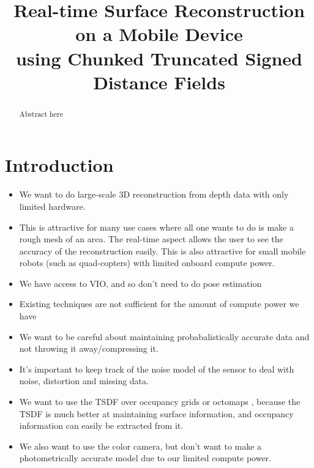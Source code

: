 \documentclass[conference,10pt]{IEEEtran}
\title{\Large Real-time Surface Reconstruction on a Mobile Device \\
using Chunked Truncated Signed Distance Fields}
\begin{document}
\maketitle

\begin{abstract}
Abstract here
\end{abstract}

\section{Introduction}
\begin{itemize}
    \item We want to do large-scale 3D reconstruction from depth data with only
    limited hardware.
    \item This is attractive for many use cases where all one wants to do is
    make a rough mesh of an area. The real-time aspect allows the user to see
    the accuracy of the reconstruction easily. This is also attractive for small
    mobile robots (such as quad-copters) with limited onboard compute power.
    \item We have access to VIO, and so don't need to do pose estimation
    \item Existing techniques are not sufficient for the amount of compute power
    we have
    \item We want to be careful about maintaining probabalistically accurate
    data and not throwing it away/compressing it.
    \item It's important to keep track of the noise model of the sensor to deal
    with noise, distortion and missing data.
    \item We want to use the TSDF over occupancy grids \cite{Elfes1989} or
    octomaps \cite{Wurm2010}, because the TSDF is much better at maintaining
    surface information, and occupancy information can easily be extracted from
    it.
    \item We also want to use the color camera, but don't want to make a
    photometrically accurate model due to our limited compute power.
\end{itemize}
\end{document}
